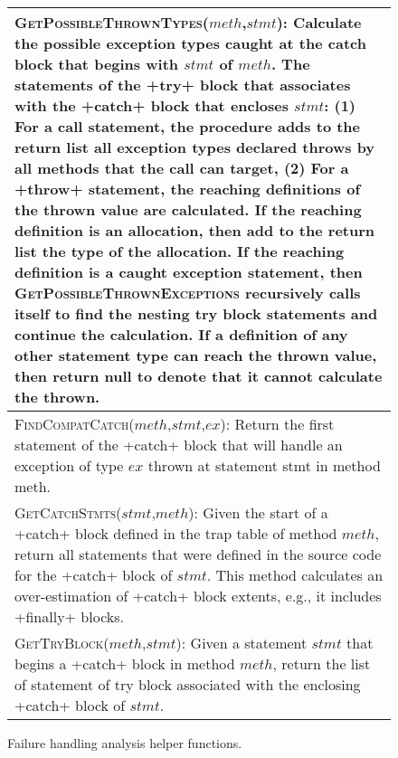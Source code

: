 \begin{figure}[t]
\scriptsize
\renewcommand*{\arraystretch}{1.3}
\begin{tabular}{|p{3.3in}|}
\hline 

\textsc{GetPossibleThrownTypes}($meth$,$stmt$): Calculate the
possible exception types caught at the catch block that begins with
$stmt$ of $meth$. The statements of the +try+ block that associates with the +catch+ block
that encloses $stmt$:  (1) For a call statement, the
procedure adds to the return list all exception types declared throws
by all methods that the call can target,  (2) For a +throw+
statement, the reaching definitions of the thrown value are
calculated.  If the reaching definition is an allocation, then add to
the return list the type of the allocation.  If the reaching
definition is a caught exception statement, then
\textsc{GetPossibleThrownExceptions} recursively calls itself to find
the nesting try block statements and continue the calculation.  If a
definition of any other statement type can reach the thrown value,
then return null to denote that it cannot calculate the
thrown.  
\\
\hline
\textsc{FindCompatCatch}($meth$,$stmt$,$ex$): Return the first
  statement of the +catch+ block that will handle an
  exception of type $ex$ thrown at statement stmt in method meth.
\\
\hline
\textsc{GetCatchStmts}($stmt$,$meth$): Given the start of a
+catch+ block defined in the trap table of method $meth$,
return all statements that were defined in the source code for the
+catch+ block of $stmt$.  This method calculates an
over-estimation of +catch+ block extents, e.g., it includes
+finally+ blocks.
\\
\hline
\textsc{GetTryBlock}($meth$,$stmt$): Given a statement $stmt$
  that begins a +catch+ block in method $meth$, return the
  list of statement of try block associated with the enclosing
  +catch+ block of $stmt$.
\\
\hline
\end{tabular}
\caption{\label{fig:helper-funs}Failure handling analysis helper functions.}
\vspace{-0.1in}
\end{figure}

